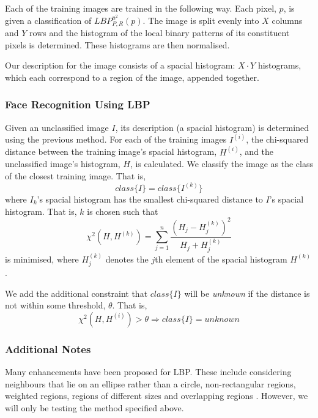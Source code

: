\documentclass{article}
\begin{document}
Each of the training images are trained in the following way. Each pixel, $p$, is given a classification of $LBP_{P,R}^{u^2}(p)$. The image is split evenly into $X$ columns and $Y$ rows and the histogram of the local binary patterns of its constituent pixels is determined. These histograms are then normalised.

Our description for the image consists of a spacial histogram: $X\cdot Y$ histograms, which each correspond to a region of the image, appended together.

\subsubsection{Face Recognition Using LBP}
Given an unclassified image $I$, its description (a spacial histogram) is determined using the previous method. For each of the training images $I^{(i)}$, the chi-squared distance between the training image's spacial histogram, $H^{(i)}$, and the unclassified image's histogram, $H$, is calculated.
We classify the image as the class of the closest training image. That is,
\begin{equation}
	class\{I\} = class\{I^{(k)}\}
\end{equation}
where $I_k$'s spacial histogram has the smallest chi-squared distance to $I$'s spacial histogram. That is, $k$ is chosen such that
\begin{equation}
	\chi^2(H, H^{(k)}) = \sum_{j=1}^{n}\frac{(H_j - H^{(k)}_j)^2}{H_j + H^{(k)}_j}
\end{equation}
is minimised, where $H^{(k)}_j$ denotes the $j$th element of the spacial histogram $H^{(k)}$.

We add the additional constraint that $class\{I\}$ will be \textit{unknown} if the distance is not within some threshold, $\theta$. That is,
\begin{equation}
	\chi^2(H, H^{(i)}) > \theta \Rightarrow class\{I\} = unknown
\end{equation}

\subsubsection{Additional Notes}
Many enhancements have been proposed for LBP. These include considering neighbours that lie on an ellipse rather than a circle, non-rectangular regions, weighted regions, regions of different sizes and overlapping regions \cite{belhumeur1997eigenfaces}. However, we will only be testing the method specified above.
\end{document}
